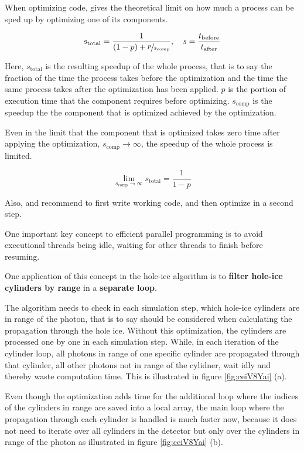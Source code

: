 When optimizing code,  gives the theoretical limit on how much a process can be sped up by optimizing one of its components. \cite{raytracingtips}

$$ s_\text{total} = \frac{1}{(1 - p) + \sfrac{p}{s_\text{comp}}}, \ \ \ s = \frac{t_\text{before}}{t_\text{after}} $$

Here, $s_\text{total}$ is the resulting speedup of the whole process, that is to say the fraction of the time the process takes before the optimization and the time the same process takes after the optimization has been applied. $p$ is the portion of execution time that the component requires before optimizing. $s_\text{comp}$ is the speedup the the component that is optimized achieved by the optimization.

Even in the limit that the component that is optimized takes zero time after applying the optimization, $s_\text{comp}\rightarrow\infty$, the speedup of the whole process is limited.

$$ \lim_{s_\text{comp}\rightarrow\infty} s_\text{total} = \frac{1}{1-p} $$

Also,  and  \cite{raytracingtips} recommend to first write working code, and then optimize in a second step.

One important key concept to efficient parallel programming is to avoid executional threads being idle, waiting for other threads to finish before resuming.


One application of this concept in the hole-ice algorithm is to \textbf{filter hole-ice cylinders by range} in a \textbf{separate loop}.

The algorithm needs to check in each simulation step, which hole-ice cylinders are in range of the photon, that is to say should be considered when calculating the propagation through the hole ice. Without this optimization, the cylinders are processed one by one in each simulation step. While, in each iteration of the cylinder loop, all photons in range of one specific cylinder are propagated through that cylinder, all other photons not in range of the cylidner, wait idly and thereby waste computation time. This is illustrated in figure \ref{fig:ceiV8Yai} (a).

Even though the optimization adds time for the additional loop where the indices of the cylinders in range are saved into a local array, the main loop where the propagation through each cylinder is handled is much faster now, because it does not need to iterate over all cylinders in the detector but only over the cylinders in range of the photon as illustrated in figure \ref{fig:ceiV8Yai} (b).

